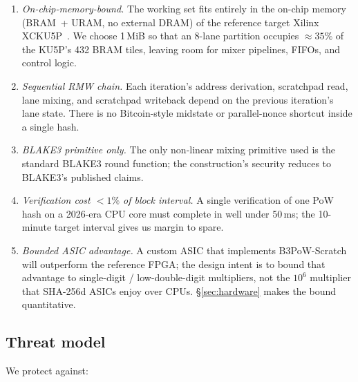 \documentclass[11pt,a4paper]{article}
\theoremstyle{plain}
\theoremstyle{definition}
\theoremstyle{remark}
\begin{document}
\begin{enumerate}\itemsep0.2em
\item[\textbf{G1}] \emph{On-chip-memory-bound.} The working set fits
      entirely in the on-chip memory (BRAM~+ URAM, no external DRAM)
      of the reference target Xilinx XCKU5P~\cite{xilinx-ku5p}.
      We choose 1\,MiB so that an 8-lane partition occupies
      $\approx 35\%$ of the KU5P's 432 BRAM tiles, leaving room for
      mixer pipelines, FIFOs, and control logic.
\item[\textbf{G2}] \emph{Sequential RMW chain.} Each iteration's
      address derivation, scratchpad read, lane mixing, and
      scratchpad writeback depend on the previous iteration's lane
      state. There is no Bitcoin-style midstate or parallel-nonce
      shortcut inside a single hash.
\item[\textbf{G3}] \emph{BLAKE3 primitive only.} The only non-linear
      mixing primitive used is the standard BLAKE3 round function;
      the construction's security reduces to BLAKE3's published
      claims.
\item[\textbf{G4}] \emph{Verification cost $<1\%$ of block interval.}
      A single verification of one PoW hash on a 2026-era CPU core
      must complete in well under 50\,ms; the 10-minute target
      interval gives us margin to spare.
\item[\textbf{G5}] \emph{Bounded ASIC advantage.} A custom ASIC that
      implements B3PoW-Scratch will outperform the reference FPGA;
      the design intent is to bound that advantage to single-digit /
      low-double-digit multipliers, not the $10^6$ multiplier that
      SHA-256d ASICs enjoy over CPUs. \S\ref{sec:hardware} makes the
      bound quantitative.
\end{enumerate}

\subsection{Threat model}\label{sec:goals-t}

We protect against:
\end{document}
